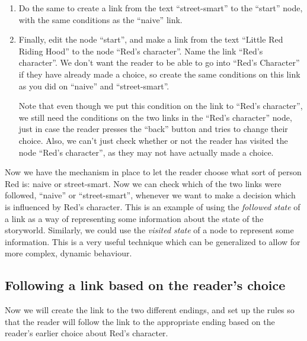 \documentclass{article}
\begin{document}
\begin{enumerate}
\item Do the same to create a link from the text ``street-smart'' to the
``start'' node, with the same conditions as the ``naive'' link.

\item Finally, edit the node ``start'', and make a link from the text ``Little
Red Riding Hood'' to the node ``Red's character''. Name the link ``Red's
character''. We don't want the reader to be able to go into ``Red's Character''
if they have already made a choice, so create the same conditions on this link
as you did on ``naive'' and ``street-smart''.

\noindent Note that even though we put this condition on the link to ``Red's
character'', we still need the conditions on the two links in the ``Red's
character'' node, just in case the reader presses the ``back'' button and
tries to change their choice. Also, we can't just check whether or not the
reader has visited the node ``Red's character'', as they may not have actually
made a choice.
\end{enumerate}

Now we have the mechanism in place to let the reader choose what sort of person
Red is: naive or street-smart. Now we can check which of the two links were
followed, ``naive'' or ``street-smart'', whenever we want to make a decision
which is influenced by Red's character. This is an example of using the
\textit{followed state} of a link as a way of representing some information about
the state of the storyworld. Similarly, we could use the \textit{visited state}
of a node to represent some information. This is a very useful technique which
can be generalized to allow for more complex, dynamic behaviour.


\subsection{Following a link based on the reader's choice}

Now we will create the link to the two different endings, and set up the rules so
that the reader will follow the link to the appropriate ending based on the
reader's earlier choice about Red's character.
\end{document}
